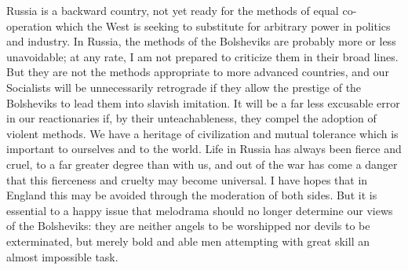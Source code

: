 Russia is a backward country, not yet ready for the methods of equal co-operation which the West is seeking to substitute for arbitrary power in politics and industry. In Russia, the methods of the Bolsheviks are probably more or less unavoidable; at any rate, I am not prepared to criticize them in their broad lines. But they are not the methods appropriate to more advanced countries, and our Socialists will be unnecessarily retrograde if they allow the prestige of the Bolsheviks to lead them into slavish imitation. It will be a far less excusable error in our reactionaries if, by their unteachableness, they compel the adoption of violent methods. We have a heritage of civilization and mutual tolerance which is important to ourselves and to the world. Life in Russia has always been fierce and cruel, to a far greater degree than with us, and out of the war has come a danger that this fierceness and cruelty may become universal. I have hopes that in England this may be avoided through the moderation of both sides. But it is essential to a happy issue that melodrama should no longer determine our views of the Bolsheviks: they are neither angels to be worshipped nor devils to be exterminated, but merely bold and able men attempting with great skill an almost impossible task.